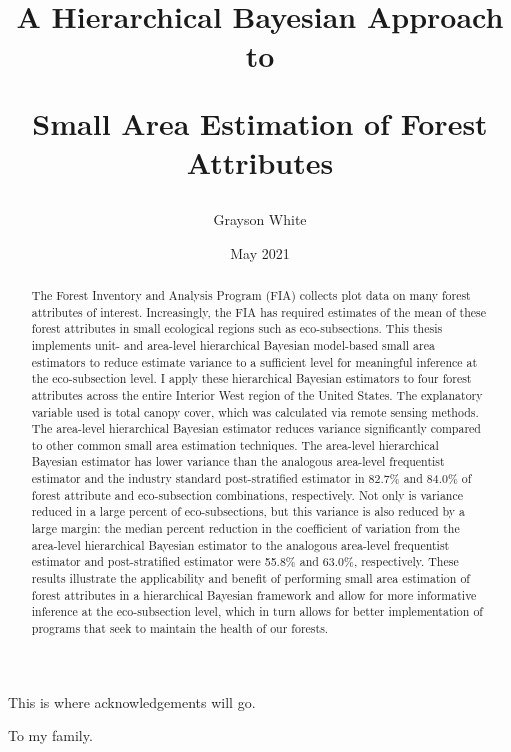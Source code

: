 \documentclass[12pt,twoside]{reedthesis}
\title{A Hierarchical Bayesian Approach to

Small Area Estimation of Forest Attributes}
\author{Grayson White}
\date{May 2021}
\begin{document}
  \maketitle

\frontmatter %
\pagestyle{empty} %
  \begin{acknowledgements}
    This is where acknowledgements will go.
  \end{acknowledgements}

  \hypersetup{linkcolor=black}
  \setcounter{secnumdepth}{2}
  \setcounter{tocdepth}{2}
  \tableofcontents

  \listoftables

  \listoffigures
  \begin{abstract}
    The Forest Inventory and Analysis Program (FIA) collects plot data on many forest attributes of interest. Increasingly, the FIA has required estimates of the mean of these forest attributes in small ecological regions such as eco-subsections. This thesis implements unit- and area-level hierarchical Bayesian model-based small area estimators to reduce estimate variance to a sufficient level for meaningful inference at the eco-subsection level. I apply these hierarchical Bayesian estimators to four forest attributes across the entire Interior West region of the United States. The explanatory variable used is total canopy cover, which was calculated via remote sensing methods. The area-level hierarchical Bayesian estimator reduces variance significantly compared to other common small area estimation techniques. The area-level hierarchical Bayesian estimator has lower variance than the analogous area-level frequentist estimator and the industry standard post-stratified estimator in 82.7\% and 84.0\% of forest attribute and eco-subsection combinations, respectively. Not only is variance reduced in a large percent of eco-subsections, but this variance is also reduced by a large margin: the median percent reduction in the coefficient of variation from the area-level hierarchical Bayesian estimator to the analogous area-level frequentist estimator and post-stratified estimator were 55.8\% and 63.0\%, respectively. These results illustrate the applicability and benefit of performing small area estimation of forest attributes in a hierarchical Bayesian framework and allow for more informative inference at the eco-subsection level, which in turn allows for better implementation of programs that seek to maintain the health of our forests.
  \end{abstract}
  \begin{dedication}
    To my family.
  \end{dedication}
\mainmatter %
\pagestyle{fancyplain} %
\end{document}
